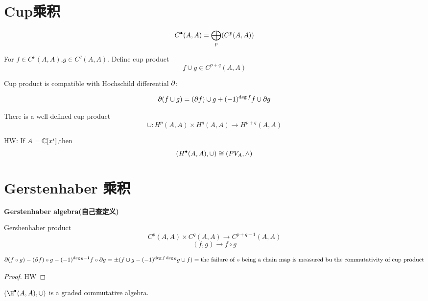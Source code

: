 \section{Cup乘积}

$$C^{\bullet}(A,A)=\bigoplus_p(C^p(A,A))$$


\begin{definition}
For $f\in C^p(A,A)$,$g\in C^q(A,A)$. Define cup product
$$f\cup g\in C^{p+q}(A,A)$$
\end{definition}

\begin{prop}
Cup product is compatible with Hochschild differential $\partial$:

$$\partial(f\cup g)=(\partial f)\cup g+(-1)^{\deg f}f\cup\partial g$$
\end{prop}


\begin{cor}
There is a well-defined cup product
$$\cup: H^p(A,A)\times H^{q}(A,A)\to H^{p+q}(A,A)$$
\end{cor}

HW: If $A=\mathbb{C}[x^i]$,then
$$(H^{\bullet}(A,A),\cup)\cong (PV_A,\wedge)$$

\section{Gerstenhaber 乘积}
\textbf{Gerstenhaber algebra(自己查定义)}

\begin{definition}Gershenhaber product
$$C^{p}(A,A)\times C^q(A,A)\to C^{p+q-1}(A,A)$$
$$(f,g)\to f\circ g$$

\end{definition}

\begin{prop}
$$\partial(f\circ g)-(\partial f)\circ g-(-1)^{\deg g-1}f\circ\partial g
=\pm(f\cup g-(-1)^{\deg f\deg g}g\cup f)
=\text{the failure of $\circ$ being a chain map
is measured bu the commutativity of cup product}$$
\end{prop}

\begin{proof}
HW
\end{proof}

\begin{cor}
$(\H\updot(A,A),\cup)$ is a graded commutative algebra.
\end{cor}

